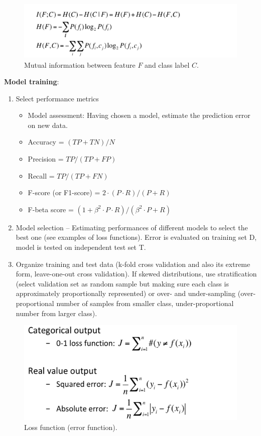     \begin{figure}[htp]
      \centering
        \includegraphics[width=.6\textwidth]{images/mutinf.png}
        \caption{Mutual information between feature $F$ and class label $C$.}
        \label{fig:mutinf}
    \end{figure}
    \newpage
	\textbf{Model training}:
	\begin{enumerate}
		\item Select performance metrics
		\begin{itemize}
			\item Model assessment: Having chosen a model, estimate the prediction error on new data.
			\item Accuracy = $(TP+TN)/N$
			\item Precision = $TP/(TP+FP)$
			\item Recall = $TP/(TP+FN)$
			\item F-score (or F1-score) = $2\cdot(P\cdot R)/(P+R)$
			\item F-beta score = $(1+\beta^2 \cdot P\cdot R)/(\beta^2\cdot P+R)$
		\end{itemize}
		\item Model selection -- Estimating performances of different models to select the best one (see examples of loss functions). Error is evaluated on training set D, model is tested on independent test set T.
		\item Organize training and test data (k-fold cross validation and also its extreme form, leave-one-out cross validation). If skewed distributions, use stratification (select validation set as random sample but making sure each class is approximately proportionally represented) or over- and under-sampling (over-proportional number of samples from smaller class, under-proportional number from larger class).
	\end{enumerate}

    \begin{figure}[htp]
      \centering
        \includegraphics[width=.6\textwidth]{images/lossf.png}
        \caption{Loss function (error function).}
        \label{fig:lossf}
    \end{figure}
